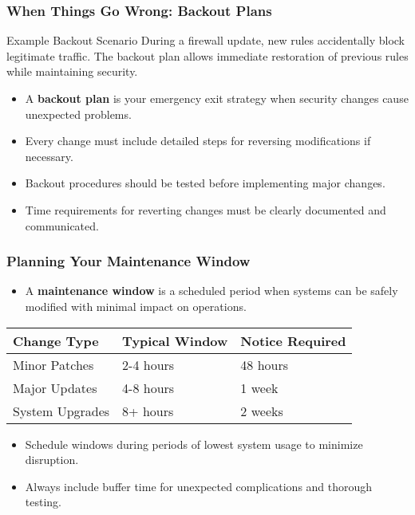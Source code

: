 \documentclass{beamer}
\begin{document}
        \begin{frame}
        \frametitle{When Things Go Wrong: Backout Plans}
        \begin{exampleblock}{Example Backout Scenario}
        During a firewall update, new rules accidentally block legitimate traffic. The backout plan allows immediate restoration of previous rules while maintaining security.
        \end{exampleblock}
        \begin{itemize}
            \item A \textbf{backout plan} is your emergency exit strategy when security changes cause unexpected problems.
            
            \item Every change must include detailed steps for reversing modifications if necessary.
            
            \item Backout procedures should be tested before implementing major changes.
            
            \item Time requirements for reverting changes must be clearly documented and communicated.
        \end{itemize}
        \end{frame}
        
        \begin{frame}
        \frametitle{Planning Your Maintenance Window}
        \begin{itemize}
            \item A \textbf{maintenance window} is a scheduled period when systems can be safely modified with minimal impact on operations.
        \end{itemize}
        \begin{table}
        \begin{tabular}{lll}
        \toprule
        \textbf{Change Type} & \textbf{Typical Window} & \textbf{Notice Required} \\
        \midrule
        Minor Patches & 2-4 hours & 48 hours \\
        Major Updates & 4-8 hours & 1 week \\
        System Upgrades & 8+ hours & 2 weeks \\
        \bottomrule
        \end{tabular}
        \end{table}
        \begin{itemize}
            \item Schedule windows during periods of lowest system usage to minimize disruption.
            
            \item Always include buffer time for unexpected complications and thorough testing.
        \end{itemize}
        \end{frame}
        
\end{document}
